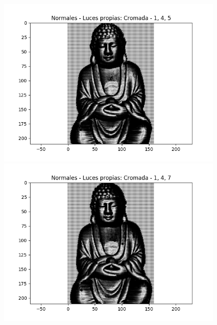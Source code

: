 \begin{figure}[H]
\centering
\begin{minipage}{.5\textwidth}
  \centering
  \includegraphics[width=1\linewidth]{informe/imagenes/normales/normalesBuda145.png}
\end{minipage}%
\begin{minipage}{.5\textwidth}
  \centering
  \includegraphics[width=1\linewidth]{informe/imagenes/normales/normalesBuda147.png}
\end{minipage}
\end{figure}

